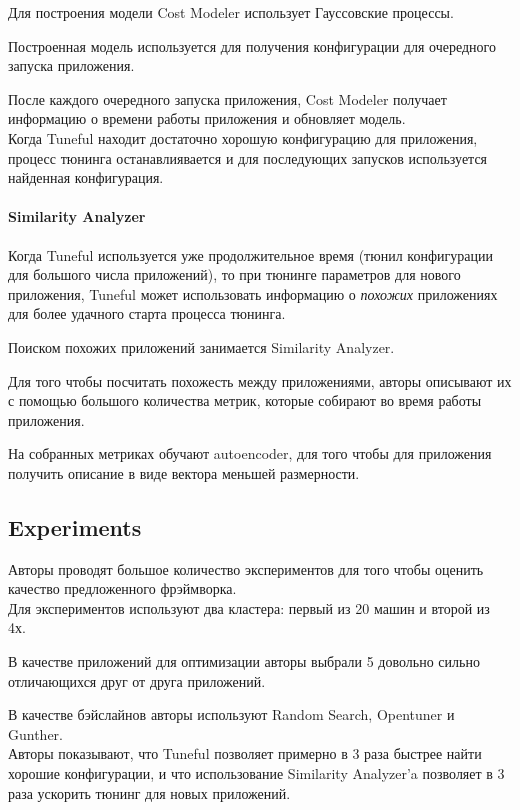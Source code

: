 Для построения модели Cost Modeler использует Гауссовские процессы.

Построенная модель используется для получения конфигурации для очередного запуска приложения.

После каждого очередного запуска приложения, Cost Modeler получает информацию о времени работы приложения и обновляет модель. \\

Когда Tuneful находит достаточно хорошую конфигурацию для приложения, процесс тюнинга останавлиявается и для последующих запусков используется найденная конфигурация.
    
\paragraph{Similarity Analyzer} Когда Tuneful используется уже продолжительное время (тюнил конфигурации для большого числа приложений), то при тюнинге параметров для нового приложения, Tuneful может использовать информацию о \textit{похожих} приложениях для более удачного старта процесса тюнинга.
    
Поиском похожих приложений занимается Similarity Analyzer.

Для того чтобы посчитать похожесть между приложениями, авторы описывают их с помощью большого количества метрик, которые собирают во время работы приложения.

На собранных метриках обучают autoencoder, для того чтобы для приложения получить описание в виде вектора меньшей размерности.

\subsection*{Experiments}

Авторы проводят большое количество экспериментов для того чтобы оценить качество предложенного фрэймворка. \\

Для экспериментов используют два кластера: первый из 20 машин и второй из 4х.

В качестве приложений для оптимизации авторы выбрали 5 довольно сильно отличающихся друг от друга приложений. 

В качестве бэйслайнов авторы используют Random Search, Opentuner и Gunther. \\

Авторы показывают, что Tuneful позволяет примерно в 3 раза быстрее найти хорошие конфигурации, и что использование Similarity Analyzer'a позволяет в 3 раза ускорить тюнинг для новых приложений.

